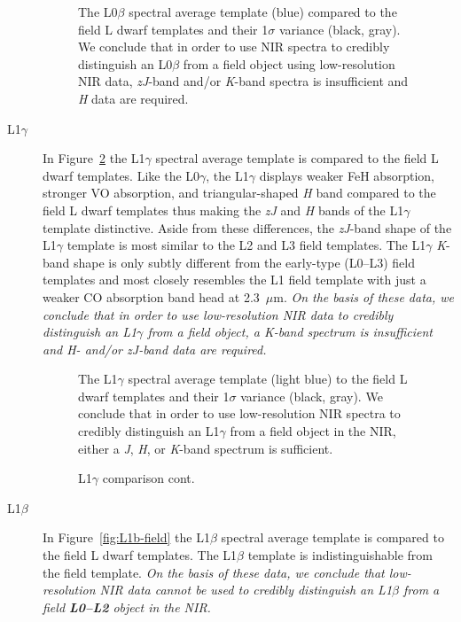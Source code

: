 \documentclass[modern]{aastex61}
\begin{document}
\begin{description}
\begin{figure}[b]
    \caption{The L0$\beta$ spectral average template (blue) compared to the field L dwarf templates and their 1$\sigma$ variance (black, gray). We conclude that in order to use NIR spectra to credibly distinguish an L0$\beta$ from a field object using low-resolution NIR data, \emph{zJ}-band and/or \emph{K}-band spectra is insufficient and \emph{H} data are required.}
    \label{fig:L0b-field}
\end{figure}
\clearpage

\item[L1$\gamma$]{
In Figure~\ref{fig:L1lg-field}\added{,} the L1$\gamma$ spectral average template is compared to the field L dwarf templates.
Like the L0$\gamma$, the L1$\gamma$ displays weaker FeH absorption, stronger VO absorption, and triangular-shaped \emph{H} band compared to the field L dwarf templates thus making the \emph{zJ} and \emph{H} bands of the L1$\gamma$ template distinctive.
Aside from these differences, the \emph{zJ}-band shape of the L1$\gamma$ template is most similar to the L2 and L3 field templates.
The L1$\gamma$ \emph{K}-band shape is only subtly different from the early-type (L0--L3) field templates and most closely resembles the L1 field template with just a weaker CO absorption band head at 2.3~$\mu$m.
\emph{On the basis of these data, we conclude that in order to use low-resolution NIR data to credibly distinguish an L1$\gamma$ from a field object, a \emph{K}-band spectrum is insufficient and \emph{H}- and/or \emph{zJ}-band data are required.}
}

\begin{figure}[b]
    \caption{The L1$\gamma$ spectral average template (light blue) to the field L dwarf templates and their 1$\sigma$ variance (black, gray). We conclude that in order to use low-resolution NIR spectra to credibly distinguish an L1$\gamma$ from a field object in the NIR, either a \emph{J}, \emph{H}, or \emph{K}-band spectrum is sufficient.}
    \label{fig:L1lg-field}
\end{figure}

\begin{figure}
  \caption{L1$\gamma$ comparison cont.}
\end{figure}
\clearpage

\item[L1$\beta$]{
In Figure~\ref{fig:L1b-field}\added{,} the L1$\beta$ spectral average template is compared to the field L dwarf templates.
The L1$\beta$ template is indistinguishable from the field template.
\emph{On the basis of these data, we conclude that low-resolution NIR data cannot be used to credibly distinguish an L1$\beta$ from a field \textbf{L0--L2} object in the NIR.}}


\end{description}
\end{document}
